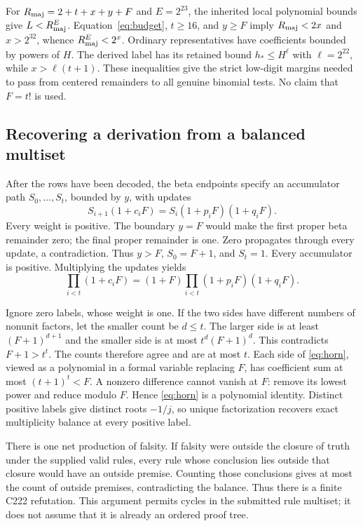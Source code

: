 \documentclass[11pt]{article}
\theoremstyle{remark}\newtheorem{remark}[theorem]{Remark}
\begin{document}
For $R_{\rm maj}=2+t+x+y+F$ and $E=2^{23}$, the inherited local
polynomial bounds give $L<R_{\rm maj}^{E}$.
Equation~\eqref{eq:budget}, $t\ge16$, and $y\ge F$ imply
$R_{\rm maj}<2x$ and $x>2^{32}$, whence
$R_{\rm maj}^{E}<2^x$.
Ordinary representatives have coefficients bounded by powers of $H$.
The derived label has its retained bound $h_*\le H^\ell$ with
$\ell=2^{22}$, while $x>\ell(t+1)$.
These inequalities give the strict low-digit margins needed to pass
from centered remainders to all genuine binomial tests.
No claim that $F=t!$ is used.

\subsection{Recovering a derivation from a balanced multiset}

After the rows have been decoded, the beta endpoints specify an
accumulator path $S_0,\ldots,S_t$, bounded by $y$, with updates
\[
 S_{i+1}(1+c_iF)=S_i(1+p_iF)(1+q_iF).
\]
Every weight is positive. The boundary $y=F$ would make the first
proper beta remainder zero; the final proper remainder is one.
Zero propagates through every update, a contradiction. Thus $y>F$,
$S_0=F+1$, and $S_t=1$. Every accumulator is positive.
Multiplying the updates yields
\begin{equation}\label{eq:horn}
 \prod_{i<t}(1+c_iF)
 =(1+F)\prod_{i<t}(1+p_iF)(1+q_iF).
\end{equation}

Ignore zero labels, whose weight is one. If the two sides have different
numbers of nonunit factors, let the smaller count be $d\le t$.
The larger side is at least $(F+1)^{d+1}$ and the smaller side is at
most $t^d(F+1)^d$. This contradicts $F+1>t^t$.
The counts therefore agree and are at most $t$.
Each side of \eqref{eq:horn}, viewed as a polynomial in a formal
variable replacing $F$, has coefficient sum at most $(t+1)^t<F$.
A nonzero difference cannot vanish at $F$: remove its lowest power
and reduce modulo $F$. Hence \eqref{eq:horn} is a polynomial identity.
Distinct positive labels give distinct roots $-1/j$, so unique
factorization recovers exact multiplicity balance at every positive label.

There is one net production of falsity. If falsity were outside the
closure of truth under the supplied valid rules, every rule whose
conclusion lies outside that closure would have an outside premise.
Counting those conclusions gives at most the count of outside premises,
contradicting the balance. Thus there is a finite C222 refutation.
This argument permits cycles in the submitted rule multiset; it does
not assume that it is already an ordered proof tree.
\end{document}
